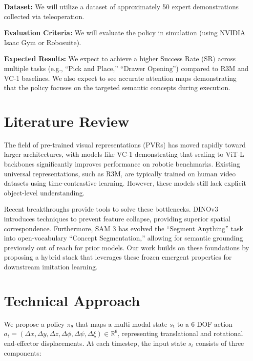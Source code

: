\documentclass[conference]{IEEEtran}
\begin{document}
\textbf{Dataset:} We will utilize a dataset of approximately 50 expert demonstrations collected via teleoperation.

\textbf{Evaluation Criteria:} We will evaluate the policy in simulation (using NVIDIA Isaac Gym or Robosuite). 

\textbf{Expected Results:} We expect to achieve a higher Success Rate (SR) across multiple tasks (e.g., ``Pick and Place,'' ``Drawer Opening'') compared to R3M and VC-1 baselines. We also expect to see accurate attention maps demonstrating that the policy focuses on the targeted semantic concepts during execution.

\section{Literature Review}
The field of pre-trained visual representations (PVRs) has moved rapidly toward larger architectures, with models like VC-1 \cite{majumdar2023vc1} demonstrating that scaling to ViT-L backbones significantly improves performance on robotic benchmarks. Existing universal representations, such as R3M, are typically trained on human video datasets using time-contrastive learning. However, these models still lack explicit object-level understanding. 

Recent breakthroughs provide tools to solve these bottlenecks. DINOv3 \cite{simeoni2025dinov3} introduces techniques to prevent feature collapse, providing superior spatial correspondence. Furthermore, SAM 3 \cite{carion2025sam3segmentconcepts} has evolved the ``Segment Anything'' task into open-vocabulary ``Concept Segmentation,'' allowing for semantic grounding previously out of reach for prior models. Our work builds on these foundations by proposing a hybrid stack that leverages these frozen emergent properties for downstream imitation learning.

\section{Technical Approach}
We propose a policy $\pi_\theta$ that maps a multi-modal state $s_t$ to a 6-DOF action $a_t = (\Delta x, \Delta y, \Delta z, \Delta \phi, \Delta \psi, \Delta \xi) \in \mathbb{R}^6$, representing translational and rotational end-effector displacements. At each timestep, the input state $s_t$ consists of three components:
\end{document}

